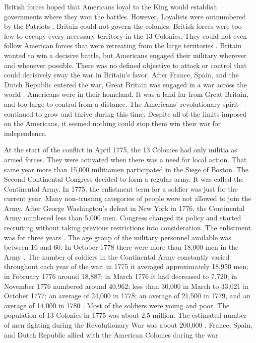 British forces hoped that Americans loyal to the King would establish
governments where they won the battles. However, Loyalists were outnumbered by
the Patriots \cite[p.201]{knollenberg_growth_2003}.  Britain could not govern the colonies.
British forces were too few to occupy every necessary territory in the 13
Colonies.  They could not even follow American forces that were retreating from
the large territories \cite[p.540-541]{mackesy1962british}.  Britain wanted to win a decisive
battle, but Americans engaged their military wherever and whenever possible.
There was no defined objective to attack or control that could decisively sway
the war in Britain’s favor.  After France, Spain, and the Dutch Republic entered
the war, Great Britain was engaged in a war across the world
\cite[540-541]{mackesy1962british}.  Americans were in their homeland.  It was a land far from Great
Britain, and too large to control from a distance.   The Americans’
revolutionary spirit continued to grow and thrive during this time.  Despite all
of the limits imposed on the Americans, it seemed nothing could stop them win
their war for independence. 

At the start of the conflict in April 1775, the 13 Colonies had only militia as
armed forces.  They were activated when there was a need for local action.  That
same year more than 15,000 militiamen participated in the Siege of Boston.  The
Second Continental Congress decided to form a regular army.  It was called the
Continental Army.  In 1775, the enlistment term for a soldier was just for the
current year.  Many non-trusting categories of people were not allowed to join
the Army.  After George Washington’s defeat in New York in 1776, the Continental
Army numbered less than 5,000 men.  Congress changed its policy and started
recruiting without taking previous restrictions into consideration. The
enlistment was for three years \cite[p.44-45]{pancake_1985}.  The age group of the
military personnel available was between 16 and 60.   In October 1778 there were
more than 18,000 men in the Army \cite[p.37]{pancake_1985}.  The number of soldiers in the
Continental Army constantly varied throughout each year of the war:  in 1775  it
averaged approximately 18,950 men; in February 1776 around 18,887;  in March
1776 it had decreased to 7,720;  in November 1776 numbered around 40,962; less
than 30,000 in March to 33,021 in October 1777; an average of 24,000 in 1778; an
average of 21,500 in 1779, and an average of 14,000 in 1780
\cite[32-33]{stephenson_patriot_2007}.  Most of the soldiers were young and poor.  The population of 13
Colonies in 1775 was about 2.5 million.  The estimated number of men fighting
during the Revolutionary War was about 200,000
\cite[p.30-31]{stephenson_patriot_2007}.  France,
Spain, and Dutch Republic allied with the American Colonies during the war.

